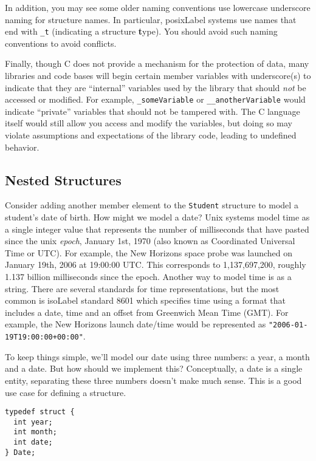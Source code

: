 In addition, you may see some older naming conventions use lowercase 
underscore naming for structure names.  In particular, \gls{posixLabel}
systems use names that end with \texttt{_t} (indicating
a structure \textbf{t}ype).  You should avoid such naming
conventions to avoid conflicts.

Finally, though C does not provide a mechanism for the protection of
data, many libraries and code bases will begin certain member variables
with underscore(s) to indicate that they are ``internal'' variables
used by the library that should \emph{not} be accessed or modified.
For example, \texttt{_someVariable} or \texttt{__anotherVariable} would indicate ``private'' variables that should
not be tampered with.  The C language itself would still allow you 
access and modify the variables, but doing so may violate assumptions
and expectations of the library code, leading to undefined behavior.

\subsection{Nested Structures}

Consider adding another member element to the \texttt{Student}
structure to model a student's date of birth.  How might we model
a date?  Unix systems model time as a single integer value that
represents the number of milliseconds that have pasted since the
unix \emph{epoch}, January 1st, 1970 (also known as Coordinated 
Universal Time or UTC).  For example, the New Horizons space probe
was launched on January 19th, 2006 at 19:00:00 UTC.  This corresponds
to 1,137,697,200, roughly 1.137 billion milliseconds since the
epoch.  Another way to model time is as a string.  There are several
standards for time representations, but the most common is \gls{isoLabel}
standard 8601 \cite{ISO:1988:IDE} which specifies time using a format that
includes a date, time and an offset from Greenwich Mean Time (GMT).
For example, the New Horizons launch date/time would be represented
as \texttt{"2006-01-19T19:00:00+00:00"}.

To keep things simple, we'll model our date using three numbers: a
year, a month and a date.  But how should we implement this?  
Conceptually, a date is a single entity, separating these three 
numbers doesn't make much sense.  This is a good use case for defining
a structure.

\begin{verbatim}
typedef struct {
  int year;
  int month;
  int date;
} Date;
\end{verbatim}

